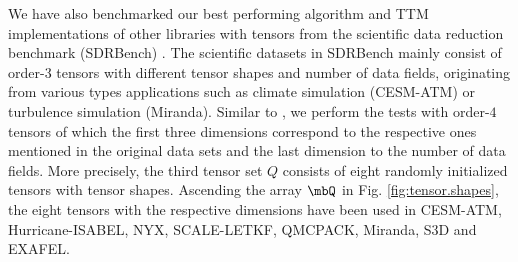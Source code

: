We have also benchmarked our best performing algorithm and TTM implementations of other libraries with tensors from the scientific data reduction benchmark (SDRBench) \cite{zhao:2020:sdrbench}.
The scientific datasets in SDRBench mainly consist of order-$3$ tensors with different tensor shapes and number of data fields, originating from various types applications such as climate simulation (CESM-ATM) or turbulence simulation (Miranda).
Similar to \cite{ballard:2020:tuckermpi}, we perform the tests with order-$4$ tensors of which the first three dimensions correspond to the respective ones mentioned in the original data sets and the last dimension to the number of data fields.
More precisely, the third tensor set $Q$ consists of eight randomly initialized tensors with tensor shapes.
Ascending the array $\mbQ$ in Fig. \ref{fig:tensor.shapes}, the eight tensors with the respective dimensions have been used in CESM-ATM, Hurricane-ISABEL, NYX, SCALE-LETKF, QMCPACK, Miranda, S3D and EXAFEL.










